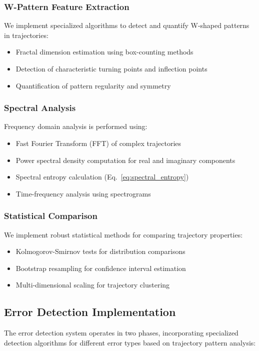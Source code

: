 \subsubsection{W-Pattern Feature Extraction}
We implement specialized algorithms to detect and quantify W-shaped patterns in trajectories:
\begin{itemize}
\item Fractal dimension estimation using box-counting methods
\item Detection of characteristic turning points and inflection points
\item Quantification of pattern regularity and symmetry
\end{itemize}

\subsubsection{Spectral Analysis}
Frequency domain analysis is performed using:
\begin{itemize}
\item Fast Fourier Transform (FFT) of complex trajectories
\item Power spectral density computation for real and imaginary components
\item Spectral entropy calculation (Eq.~\ref{eq:spectral_entropy})
\item Time-frequency analysis using spectrograms
\end{itemize}

\subsubsection{Statistical Comparison}
We implement robust statistical methods for comparing trajectory properties:
\begin{itemize}
\item Kolmogorov-Smirnov tests for distribution comparisons
\item Bootstrap resampling for confidence interval estimation
\item Multi-dimensional scaling for trajectory clustering
\end{itemize}

\subsection{Error Detection Implementation}

The error detection system operates in two phases, incorporating specialized detection algorithms for different error types based on trajectory pattern analysis:

